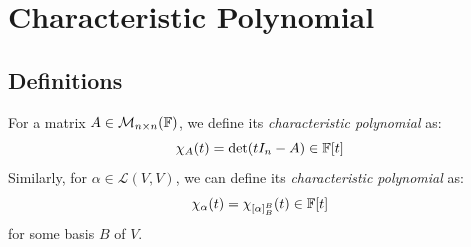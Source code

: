 \documentclass[../main.tex]{subfiles}
\begin{document}
\section{Characteristic Polynomial}
\subsection{Definitions}
\begin{definition}
  For a matrix $A \in \mathcal{M}_{n \times n}(\mathbb{F})$, we define its \textit{characteristic polynomial} as:
  \[
    \chi_A(t) = \det(tI_n - A) \in \mathbb{F}[t]
  \]
  Similarly, for $\alpha \in \mathcal{L}(V, V)$, we can define its \textit{characteristic polynomial} as:
  \[
    \chi_{\alpha}(t) = \chi_{[\alpha]^{B}_{B}}(t) \in \mathbb{F}[t]
  \]
  for some basis $B$ of $V$.
\end{definition}
\end{document}
